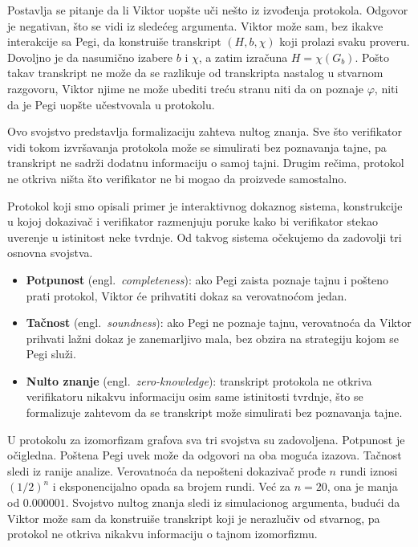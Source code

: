 Postavlja se pitanje da li Viktor uopšte uči nešto iz izvođenja protokola.
Odgovor je negativan, što se vidi iz sledećeg argumenta. Viktor može sam,
bez ikakve interakcije sa Pegi, da konstruiše transkript $(H,b,\chi)$ koji
prolazi svaku proveru. Dovoljno je da nasumično izabere $b$ i $\chi$, a
zatim izračuna $H=\chi(G_b)$. Pošto takav transkript ne može da se razlikuje
od transkripta nastalog u stvarnom razgovoru, Viktor njime ne može ubediti
treću stranu niti da on poznaje $\varphi$, niti da je Pegi uopšte učestvovala
u protokolu.

Ovo svojstvo predstavlja formalizaciju zahteva nultog znanja. Sve što
verifikator vidi tokom izvršavanja protokola može se simulirati bez
poznavanja tajne, pa transkript ne sadrži dodatnu informaciju o samoj
tajni. Drugim rečima, protokol ne otkriva ništa što verifikator ne bi
mogao da proizvede samostalno.

Protokol koji smo opisali primer je interaktivnog dokaznog sistema, 
konstrukcije u kojoj dokazivač i verifikator razmenjuju poruke kako bi 
verifikator stekao uverenje u istinitost neke tvrdnje. Od takvog sistema 
očekujemo da zadovolji tri osnovna svojstva.

\begin{itemize}
  \item \textbf{Potpunost} (engl.\ \textit{completeness}): ako Pegi 
  zaista poznaje tajnu i pošteno prati protokol, Viktor će prihvatiti 
  dokaz sa verovatnoćom jedan.
  
  \item \textbf{Tačnost} (engl.\ \textit{soundness}): ako Pegi ne poznaje 
  tajnu, verovatnoća da Viktor prihvati lažni dokaz je zanemarljivo mala, 
  bez obzira na strategiju kojom se Pegi služi.

  \item \textbf{Nulto znanje} (engl.\ \textit{zero-knowledge}): transkript 
  protokola ne otkriva verifikatoru nikakvu informaciju osim same 
  istinitosti tvrdnje, što se formalizuje zahtevom da se transkript može 
  simulirati bez poznavanja tajne.
\end{itemize}

U protokolu za izomorfizam grafova sva tri svojstva su zadovoljena. 
Potpunost je očigledna. Poštena Pegi uvek može da odgovori na oba 
moguća izazova. Tačnost sledi iz ranije analize. Verovatnoća da nepošteni dokazivač
prođe $n$ rundi iznosi $(1/2)^n$ i eksponencijalno opada sa brojem
rundi. Već za $n=20$, ona je manja od $0.000001$.
Svojstvo nultog znanja sledi iz simulacionog argumenta, budući da Viktor može 
sam da konstruiše transkript koji je nerazlučiv od stvarnog, pa 
protokol ne otkriva nikakvu informaciju o tajnom izomorfizmu.

